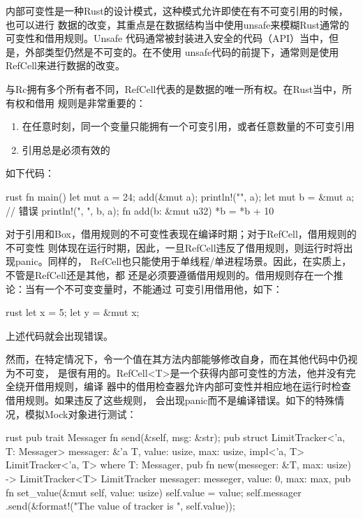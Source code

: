 内部可变性是一种Rust的设计模式，这种模式允许即使在有不可变引用的时候，也可以进行
数据的改变，其重点是在数据结构当中使用unsafe来模糊Rust通常的可变性和借用规则。Unsafe
代码通常被封装进入安全的代码（API）当中，但是，外部类型仍然是不可变的。在不使用
unsafe代码的前提下，通常则是使用RefCell来进行数据的改变。

与Rc拥有多个所有者不同，RefCell代表的是数据的唯一所有权。在Rust当中，所有权和借用
规则是非常重要的：
\begin{enumerate}
  \item 在任意时刻，同一个变量只能拥有一个可变引用，或者任意数量的不可变引用
  \item 引用总是必须有效的
\end{enumerate}
如下代码：
\begin{code-block}{rust}
fn main() {
    let mut a = 24;
    add(&mut a);
    println!("{}", a);
    let mut b = &mut a;
    // 错误
    println!("{}, {}", b, a);
}
fn add(b: &mut u32) {
    *b = *b + 10
}
\end{code-block}

对于引用和Box，借用规则的不可变性表现在编译时期；对于RefCell，借用规则的不可变性
则体现在运行时期，因此，一旦RefCell违反了借用规则，则运行时将出现panic。同样的，
RefCell也只能使用于单线程/单进程场景。因此，在实质上，不管是RefCell还是其他，都
还是必须要遵循借用规则的。借用规则存在一个推论：当有一个不可变变量时，不能通过
可变引用借用他，如下：
\begin{code-block}{rust}
let x = 5;
let y = &mut x;
\end{code-block}
上述代码就会出现错误。

然而，在特定情况下，令一个值在其方法内部能够修改自身，而在其他代码中仍视为不可变，
是很有用的。RefCell<T>是一个获得内部可变性的方法，他并没有完全绕开借用规则，编译
器中的借用检查器允许内部可变性并相应地在运行时检查借用规则。如果违反了这些规则，
会出现panic而不是编译错误。如下的特殊情况，模拟Mock对象进行测试：
\begin{code-block}{rust}
pub trait Messager {
    fn send(&self, msg: &str);
}
pub struct LimitTracker<'a, T: Messager> {
    messager: &'a T,
    value: usize,
    max: usize,
}
impl<'a, T> LimitTracker<'a, T>
where
    T: Messager,
{
    pub fn new(messeger: &T, max: usize) -> LimitTracker<T> {
        LimitTracker {
            messager: messeger,
            value: 0,
            max: max,
        }
    }
    pub fn set_value(&mut self, value: usize) {
        self.value = value;
        self.messager
            .send(&format!("The value of tracker is {}", self.value));
    }
}
\end{code-block}


